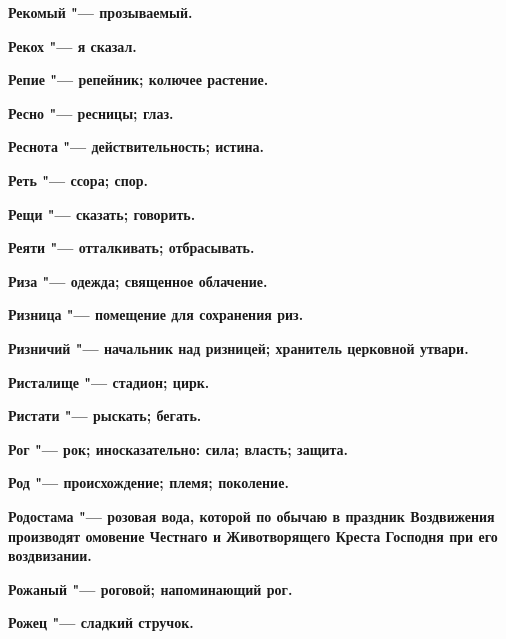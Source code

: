 \begin{multicols}{2}
\bfseries Рекомый\normalfont{} "--- прозываемый. 




\bfseries Рекох\normalfont{} "--- я сказал. 




\bfseries Репие\normalfont{} "--- репейник; колючее растение. 




\bfseries Ресно\normalfont{} "--- ресницы; глаз. 




\bfseries Реснота\normalfont{} "--- действительность; истина. 




\bfseries Реть\normalfont{} "--- ссора; спор. 




\bfseries Рещи\normalfont{} "--- сказать; говорить. 




\bfseries Реяти\normalfont{} "--- отталкивать; отбрасывать. 




\bfseries Риза\normalfont{} "--- одежда; священное облачение. 




\bfseries Ризница\normalfont{} "--- помещение для сохранения риз. 




\bfseries Ризничий\normalfont{} "--- начальник над ризницей; хранитель церковной утвари. 




\bfseries Ристалище\normalfont{} "--- стадион; цирк. 




\bfseries Ристати\normalfont{} "--- рыскать; бегать. 




\bfseries Рог\normalfont{} "--- рок; иносказательно: сила; власть; защита. 




\bfseries Род\normalfont{} "--- происхождение; племя; поколение. 




\bfseries Родостама\normalfont{} "--- розовая вода, которой по обычаю в праздник Воздвижения производят омовение Честнаго и Животворящего Креста Господня при его воздвизании. 




\bfseries Рожаный\normalfont{} "--- роговой; напоминающий рог. 




\bfseries Рожец\normalfont{} "--- сладкий стручок. 





\end{multicols}
